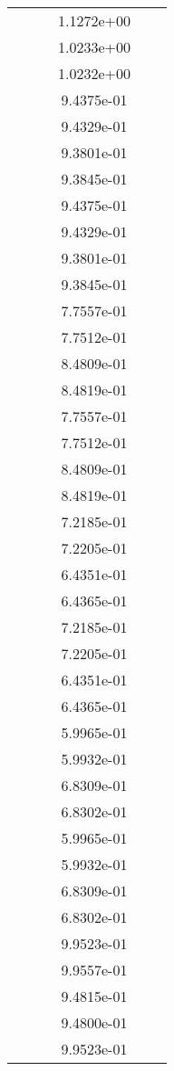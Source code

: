 \begin{xltabular}{\textwidth}{r|rS[table-format=1.3e+2]S[table-format=1.4e+2]S[table-format=1.4e+2]S[table-format=-1.5]}
&  &  & 1.1272e+00 & & \\
&  &  & 1.0233e+00 & & \\
&  &  & 1.0232e+00 & & \\
&  &  & 9.4375e-01 & & \\
&  &  & 9.4329e-01 & & \\
&  &  & 9.3801e-01 & & \\
&  &  & 9.3845e-01 & & \\
&  &  & 9.4375e-01 & & \\
&  &  & 9.4329e-01 & & \\
&  &  & 9.3801e-01 & & \\
&  &  & 9.3845e-01 & & \\
&  &  & 7.7557e-01 & & \\
&  &  & 7.7512e-01 & & \\
&  &  & 8.4809e-01 & & \\
&  &  & 8.4819e-01 & & \\
&  &  & 7.7557e-01 & & \\
&  &  & 7.7512e-01 & & \\
&  &  & 8.4809e-01 & & \\
&  &  & 8.4819e-01 & & \\
&  &  & 7.2185e-01 & & \\
&  &  & 7.2205e-01 & & \\
&  &  & 6.4351e-01 & & \\
&  &  & 6.4365e-01 & & \\
&  &  & 7.2185e-01 & & \\
&  &  & 7.2205e-01 & & \\
&  &  & 6.4351e-01 & & \\
&  &  & 6.4365e-01 & & \\
&  &  & 5.9965e-01 & & \\
&  &  & 5.9932e-01 & & \\
&  &  & 6.8309e-01 & & \\
&  &  & 6.8302e-01 & & \\
&  &  & 5.9965e-01 & & \\
&  &  & 5.9932e-01 & & \\
&  &  & 6.8309e-01 & & \\
&  &  & 6.8302e-01 & & \\
&  &  & 9.9523e-01 & & \\
&  &  & 9.9557e-01 & & \\
&  &  & 9.4815e-01 & & \\
&  &  & 9.4800e-01 & & \\
&  &  & 9.9523e-01 & & \\

\end{xltabular}
